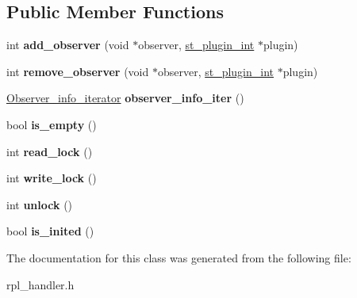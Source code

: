 \subsection*{Public Member Functions}
\begin{DoxyCompactItemize}
\item 
\mbox{\label{classDelegate_aec7d19863f9c29f31b1be31e9f12932d}} 
int {\bfseries add\+\_\+observer} (void $\ast$observer, \mbox{\hyperlink{structst__plugin__int}{st\+\_\+plugin\+\_\+int}} $\ast$plugin)
\item 
\mbox{\label{classDelegate_ad73ae006b663be7b587d596051d7fa13}} 
int {\bfseries remove\+\_\+observer} (void $\ast$observer, \mbox{\hyperlink{structst__plugin__int}{st\+\_\+plugin\+\_\+int}} $\ast$plugin)
\item 
\mbox{\label{classDelegate_a2fa0d3fc8a1789ebfe5d3b1598bf8e32}} 
\mbox{\hyperlink{classList__iterator}{Observer\+\_\+info\+\_\+iterator}} {\bfseries observer\+\_\+info\+\_\+iter} ()
\item 
\mbox{\label{classDelegate_a2ad2713cbbf707269d9713ca484058a4}} 
bool {\bfseries is\+\_\+empty} ()
\item 
\mbox{\label{classDelegate_a18bd9617682ef9631d8f847745f4b39f}} 
int {\bfseries read\+\_\+lock} ()
\item 
\mbox{\label{classDelegate_a19ae008cd3fe864f0eab29c9307f89ae}} 
int {\bfseries write\+\_\+lock} ()
\item 
\mbox{\label{classDelegate_a0be34c4580e144d1ba19d4e7fedd708f}} 
int {\bfseries unlock} ()
\item 
\mbox{\label{classDelegate_a0217d3246f697bb3e67ffa7fdb353911}} 
bool {\bfseries is\+\_\+inited} ()
\end{DoxyCompactItemize}


The documentation for this class was generated from the following file\+:\begin{DoxyCompactItemize}
\item 
rpl\+\_\+handler.\+h\end{DoxyCompactItemize}
